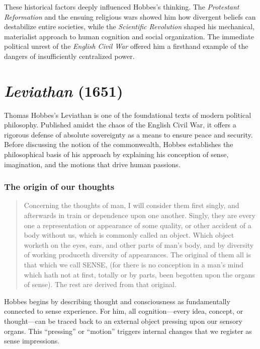         These historical factors deeply influenced Hobbes’s thinking. The \textit{Protestant Reformation} and the ensuing religious wars showed him how divergent beliefs can destabilize entire societies, while the \textit{Scientific Revolution} shaped his mechanical, materialist approach to human cognition and social organization. The immediate political unrest of the \textit{English Civil War} offered him a firsthand example of the dangers of insufficiently centralized power.

\section{\textit{Leviathan} (1651)}

    Thomas Hobbes’s Leviathan is one of the foundational texts of modern political philosophy. Published amidst the chaos of the English Civil War, it offers a rigorous defense of absolute sovereignty as a means to ensure peace and security. Before discussing the notion of the commonwealth, Hobbes establishes the philosophical basis of his approach by explaining his conception of sense, imagination, and the motions that drive human passions.

        \subsubsection{The origin of our thoughts}

            \begin{quote}
                Concerning the thoughts of man, I will consider them first singly, and afterwards in train or dependence upon one another. Singly, they are every one a representation or appearance of some quality, or other accident of a body without us, which is commonly called an object. Which object worketh on the eyes, ears, and other parts of man’s body, and by diversity of working produceth diversity of appearances.  The original of them all is that which we call SENSE, (for there is no conception in a man’s mind which hath not at first, totally or by parts, been begotten upon the organs of sense). The rest are derived from that original. 
            \end{quote} 

            Hobbes begins by describing thought and consciousness as fundamentally connected to sense experience. For him, all cognition—every idea, concept, or thought—can be traced back to an external object pressing upon our sensory organs. This “pressing” or “motion” triggers internal changes that we register as sense impressions.

